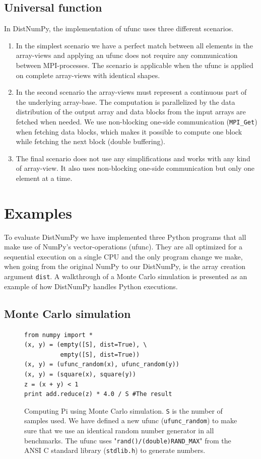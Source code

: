 \documentclass[10pt]{article}
\begin{document}
\subsection{Universal function}
In DistNumPy, the implementation of ufunc uses three different scenarios.
\begin{enumerate}
\item In the simplest scenario we have a perfect match between all elements in the array-views and applying an ufunc does not require any communication between MPI-processes. The scenario is applicable when the ufunc is applied on complete array-views with identical shapes.
\item In the second scenario the array-views must represent a continuous part of the underlying array-base. The computation is parallelized by the data distribution of the output array and data blocks from the input arrays are fetched when needed. We use non-blocking one-side communication (\texttt{MPI\_Get}) when fetching data blocks, which makes it possible to compute one block while fetching the next block (double buffering).
\item The final scenario does not use any simplifications and works with any kind of array-view. It also uses non-blocking one-side communication but only one element at a time.
\end{enumerate}


\section{Examples}
To evaluate DistNumPy we have implemented three Python programs that all make use of NumPy's vector-operations (ufunc). They are all optimized for a sequential execution on a single CPU and the only program change we make, when going from the original NumPy to our DistNumPy, is the array creation argument \texttt{dist}. 
A walkthrough of a Monte Carlo simulation is presented as an example of how DistNumPy handles Python executions.


\subsection{Monte Carlo simulation}
\begin{figure}
\begin{lstlisting}
from numpy import *
(x, y) = (empty([S], dist=True), \
		  empty([S], dist=True))
(x, y) = (ufunc_random(x), ufunc_random(y))
(x, y) = (square(x), square(y))
z = (x + y) < 1
print add.reduce(z) * 4.0 / S #The result
\end{lstlisting}
 \caption{Computing Pi using Monte Carlo simulation. \texttt{S} is the number of samples used. We have defined a new ufunc (\texttt{ufunc\_random}) to make sure that we use an identical random number generator in all benchmarks. The ufunc uses "\texttt{rand()/(double)RAND\_MAX}" from the ANSI C standard library (\texttt{stdlib.h}) to generate numbers.}
 \label{lst:montecarlo}
\end{figure}
\end{document}
